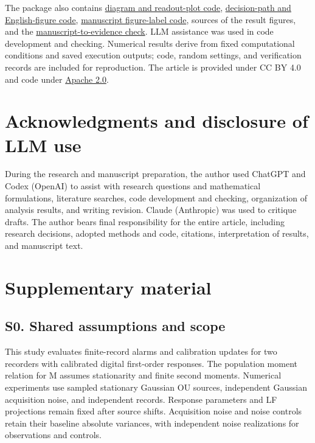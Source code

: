 \documentclass[10pt,a4paper]{article}
\begin{document}
The package also contains \href{https://github.com/metaSATOKEN/First-Order-Probes/blob/789f3c83bc85511d9e7a65f083c5806f2d36e8f2/numerics/scripts/draw_manuscript_ja_v1_figures.py}{diagram and readout-plot code}, \href{https://github.com/metaSATOKEN/First-Order-Probes/blob/789f3c83bc85511d9e7a65f083c5806f2d36e8f2/numerics/scripts/draw_manuscript_bilingual_v1_figures.py}{decision-path and English-figure code}, \href{https://github.com/metaSATOKEN/First-Order-Probes/blob/789f3c83bc85511d9e7a65f083c5806f2d36e8f2/numerics/scripts/draw_manuscript_ja_v5_en_v2_labels.py}{manuscript figure-label code}, sources of the result figures, and the \href{https://github.com/metaSATOKEN/First-Order-Probes/blob/789f3c83bc85511d9e7a65f083c5806f2d36e8f2/provenance/MANUSCRIPT_CHECK.md}{manuscript-to-evidence check}. LLM assistance was used in code development and checking. Numerical results derive from fixed computational conditions and saved execution outputs; code, random settings, and verification records are included for reproduction. The article is provided under CC BY 4.0 and code under \href{https://github.com/metaSATOKEN/First-Order-Probes/blob/789f3c83bc85511d9e7a65f083c5806f2d36e8f2/LICENSE}{Apache 2.0}.

\section{Acknowledgments and disclosure of LLM use}

During the research and manuscript preparation, the author used ChatGPT and Codex (OpenAI) to assist with research questions and mathematical formulations, literature searches, code development and checking, organization of analysis results, and writing revision. Claude (Anthropic) was used to critique drafts. The author bears final responsibility for the entire article, including research decisions, adopted methods and code, citations, interpretation of results, and manuscript text.

\clearpage

\section{Supplementary material}

\subsection{S0. Shared assumptions and scope}

This study evaluates finite-record alarms and calibration updates for two recorders with calibrated digital first-order responses. The population moment relation for M assumes stationarity and finite second moments. Numerical experiments use sampled stationary Gaussian OU sources, independent Gaussian acquisition noise, and independent records. Response parameters and LF projections remain fixed after source shifts. Acquisition noise and noise controls retain their baseline absolute variances, with independent noise realizations for observations and controls.
\end{document}
